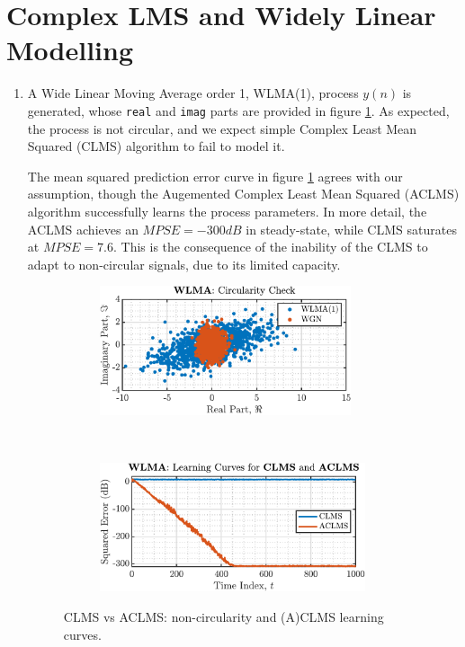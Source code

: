 \section{Complex LMS and Widely Linear Modelling}

\begin{enumerate}[label=\alph*), leftmargin=*]

\item
%

A Wide Linear Moving Average order 1, WLMA(1), process $y(n)$ is generated, whose \texttt{real} and \texttt{imag} parts are provided in figure \ref{fig:4_1_a}.
As expected, the process is not circular, and we expect simple Complex Least Mean Squared (CLMS) algorithm to fail to model it.

The mean squared prediction error curve in figure \ref{fig:4_1_a} agrees with our assumption, though the Augemented Complex Least Mean Squared (ACLMS) algorithm
successfully learns the process parameters. In more detail, the ACLMS achieves an $MPSE = -300dB$ in steady-state, while CLMS saturates at $MPSE = 7.6$. This is
the consequence of the inability of the CLMS to adapt to non-circular signals, due to its limited capacity.

\begin{figure}[h]
    \centering
    \begin{subfigure}{0.49\textwidth}
        \centering
        \includegraphics[height=1.5in]{report/widely-linear-filtering-and-adaptive-spectrum-estimation/complex-LMS-and-widely-linear-modelling/assets/a/comparison}
    \end{subfigure}
    ~
    \begin{subfigure}{0.49\textwidth}
        \centering
        \includegraphics[height=1.5in]{report/widely-linear-filtering-and-adaptive-spectrum-estimation/complex-LMS-and-widely-linear-modelling/assets/a/learning_curves}
    \end{subfigure}
    \caption{CLMS vs ACLMS: non-circularity and (A)CLMS learning curves.}
    \label{fig:4_1_a}
\end{figure}


\end{enumerate}

